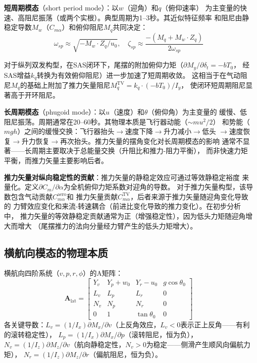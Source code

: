 \documentclass[a4paper,12pt]{ctexart}
\theoremstyle{plain}
\theoremstyle{definition}
\begin{document}
\textbf{短周期模态}（short period mode）：以$w$（迎角）和$q$（俯仰速率）
为主变量的快速、高阻尼振荡（或两个实根）。典型周期为1--3秒。其近似特征频率
和阻尼由静稳定导数$M_w$（$C_{m\alpha}$）和俯仰阻尼$M_q$共同决定：
\begin{equation}
    \omega_{sp} \approx \sqrt{-M_w \cdot Z_q/u_0}, \quad
    \zeta_{sp} \approx \frac{-(M_q + M_{\dot{w}} \cdot Z_q)}{2\omega_{sp}}
\end{equation}

对于纵列双发构型，在SAS闭环下，尾摆的附加俯仰力矩（$\partial M_y / \partial \delta_t = -b T_0$，
经SAS增益$k_q$转换为有效俯仰阻尼）进一步加速了短周期收敛。
这相当于在气动阻尼$M_q$的基础上附加了推力矢量阻尼$M_q^{\text{TV}} = k_q \cdot (-b T_0) / I_y$，
使闭环短周期阻尼显著高于开环阻尼。

\textbf{长周期模态}（phugoid mode）：以$u$（速度）和$\theta$（俯仰角）为主变量的
缓慢、低阻尼振荡。周期通常在20--60秒。其物理本质是飞行器动能（$\sim mu^2/2$）
和势能（$mgh$）之间的缓慢交换：飞行器抬头$\to$速度下降$\to$升力减小$\to$低头
$\to$速度恢复$\to$升力恢复$\to$再次抬头。推力矢量的摆角变化对长周期模态的影响
通常不显著——长周期主要取决于总能量交换（升阻比和推力-阻力平衡），
而非快速力矩平衡，而推力矢量主要影响后者。

\textbf{推力矢量对纵向稳定性的贡献}：推力矢量的静稳定效应可通过等效静稳定裕度
来量化。定义$\partial C_m / \partial \alpha$为全机俯仰力矩系数对迎角的导数。
对于推力矢量构型，该导数包含气动贡献$C_{m\alpha}^{\text{aero}}$和
推力矢量贡献$C_{m\alpha}^{\text{TV}}$，后者来源于推力矢量随迎角变化导致的
力臂效应变化和来流-转速耦合（前进比变化导致的推力变化）。在初步分析中，
推力矢量的等效静稳定贡献通常为正（增强稳定性），因为低头力矩随迎角增大而增大
（尾摆推力的法向分量经力臂产生的低头力矩增大）。

\subsection{横航向模态的物理本质}

横航向四阶系统（$v, p, r, \phi$）的A矩阵：
\begin{equation}
    \bm{A}_{\text{lat}} =
    \begin{bmatrix}
        Y_v & Y_p + w_0 & Y_r - u_0 & g\cos\theta_0 \\
        L_v & L_p & L_r & 0 \\
        N_v & N_p & N_r & 0 \\
        0 & 1 & \tan\theta_0 & 0
    \end{bmatrix}
    \label{eq:lateral}
\end{equation}
各关键导数：$L_v = (1/I_x)\partial M_x/\partial v$（上反角效应，$L_v < 0$表示正上反角——有利的滚转稳定性），
$L_p = (1/I_x)\partial M_x/\partial p$（滚转阻尼，恒为负），
$N_v = (1/I_z)\partial M_z/\partial v$（航向静稳定性，$N_v > 0$为稳定——侧滑产生顺风向偏航力矩），
$N_r = (1/I_z)\partial M_z/\partial r$（偏航阻尼，恒为负）。
\end{document}
